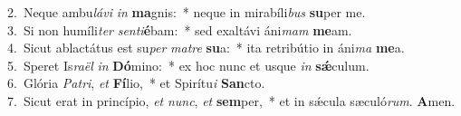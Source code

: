 {2.~}Neque ambu\textit{lá}\textit{vi} \textit{in} \textbf{ma}gnis:~* neque in mirabíli\textit{bus} \textbf{su}per me.\\
{3.~}Si non humíli\textit{ter} \textit{sen}\textit{ti}\textbf{é}bam:~* sed exaltávi áni\textit{mam} \textbf{me}am.\\
{4.~}Sicut ablactátus est su\textit{per} \textit{ma}\textit{tre} \textbf{su}a:~* ita retribútio in áni\textit{ma} \textbf{me}a.\\
{5.~}Speret Is\textit{ra}\textit{ël} \textit{in} \textbf{Dó}mino:~* ex hoc nunc et usque \textit{in} \textbf{sǽ}culum.\\
{6.~}Glória \textit{Pa}\textit{tri}, \textit{et} \textbf{Fí}lio,~* et Spirítu\textit{i} \textbf{San}cto.\\
{7.~}Sicut erat in princípio, \textit{et} \textit{nunc}, \textit{et} \textbf{sem}per,~* et in sǽcula sæculó\textit{rum}. \textbf{A}men.\\
